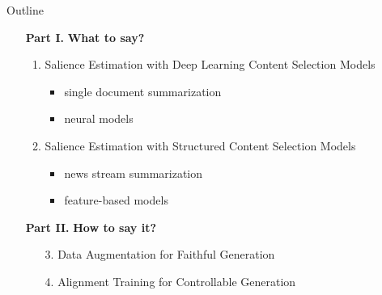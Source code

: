 \begin{frame}{Outline}
    \begin{itemize}
        \item[\textbf{Part I.}] \textbf{What to say?}
        \begin{enumerate}
            \item Salience Estimation with Deep Learning Content Selection
                    Models
        \begin{itemize}
            \item single document summarization
            \item neural models
        \end{itemize}
            \item Salience Estimation with Structured Content Selection Models 
        \begin{itemize}
            \item news stream summarization
            \item feature-based models
        \end{itemize}
        \end{enumerate}
        \vspace{10pt}
    \item[\textbf{Part II.}] \textbf{How to say it?}
        \begin{enumerate}
            \item[3.] Data Augmentation for Faithful Generation
            \item[4.] Alignment Training for Controllable Generation
        \end{enumerate}
    \end{itemize}

\end{frame}
